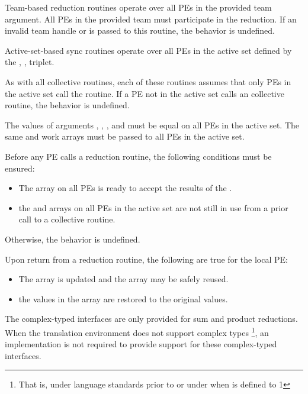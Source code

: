 \begin{apidefinition}
{{\color{Green}
    Team-based reduction routines operate over all \acp{PE} in the provided team argument. All
    \acp{PE} in the provided team must participate in the reduction. If an invalid team handle
    or  is passed to this routine, the behavior is undefined.

    Active-set-based sync routines operate over all \acp{PE} in the active set
    defined by the , ,  triplet.
}

    As with all \oldtext{\openshmem}  collective routines,
    each of these routines assumes
    that only \acp{PE} in the active set call the routine.  If a \ac{PE} not in
    the active set calls an \oldtext{\openshmem}  collective routine,
    the behavior is undefined.

    The values of arguments , , ,
    and  must be equal on all \acp{PE} in the active set.
    The same  and  work arrays must be passed to all
    \acp{PE} in the active set.

    Before any \ac{PE} calls a reduction routine, the following conditions must be ensured:
    \begin{itemize}
    \item The \dest{} array on all \acp{PE} 
      is ready to accept the results of the .
    \item {} the
       and  arrays on all \acp{PE} in the
      active set are not still in use from a prior call to a collective
      \openshmem routine.
    \end{itemize}
    Otherwise, the behavior is undefined.
    
    Upon return from a reduction routine, the following are true for the local
    \ac{PE}:
    \begin{itemize}
    \item The \dest{} array is updated and the \source{} array may be safely reused.
    \item {}
    the values in the  array are restored to the original values.
    \end{itemize}

    The complex-typed interfaces are only provided for sum and product reductions.
    When the \Cstd translation environment does not support complex types
    \footnote{That is, under \Cstd language standards prior to \Cstd[99] or under \Cstd[11]
    when  is defined to 1}, an \openshmem
    implementation is not required to provide support for these
    complex-typed interfaces.
}




\end{apidefinition}

